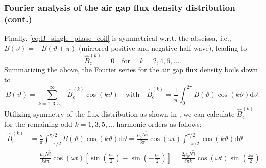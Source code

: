 \begin{frame}
	\frametitle{Fourier analysis of the air gap flux density distribution (cont.)}
        Finally, \eqref{eq:B_single_phase_coil} is symmetrical w.r.t. the abscissa, i.e., $B(\vartheta)=-B(\vartheta+\pi)$ (mirrored positive and negative half-wave), leading to
        $$\hat{B}_{\mathrm{c}}^{(k)} = 0 \quad \mbox{for } \quad k=2,4,6,\ldots .$$
        Summarizing the above, the Fourier series for the air gap flux density boils down to
        \begin{equation}
            B(\vartheta) = \sum_{k=1,3,5,\ldots}^{\infty} \hat{B}_{\mathrm{c}}^{(k)} \cos(k \vartheta) \quad \mbox{with} \quad \hat{B}_{\mathrm{c}}^{(k)} = \frac{1}{\pi} \int_{0}^{2 \pi} B(\vartheta) \cos(k \vartheta) \mathrm{d}\vartheta.
            \label{eq:fourier_series_B_single_phase_coil_reduced}
        \end{equation}
        Utilizing symmetry of the flux distribution as shown in , we can calculate $\hat{B}_{\mathrm{c}}^{(k)}$ for the remaining odd $k=1,3,5,\ldots$ harmonic orders as follows:
        \begin{equation}
            \begin{split}
                \hat{B}_{\mathrm{c}}^{(k)} &= \frac{2}{\pi} \int_{-\pi/2}^{\pi/2} B(\vartheta) \cos(k \vartheta) \mathrm{d}\vartheta = \frac{\mu_0 N \hat{i}}{\delta \pi } \cos(\omega t) \int_{-\pi/2}^{\pi/2} \cos(k \vartheta) \mathrm{d}\vartheta \\ &= \frac{\mu_0 N \hat{i}}{k \delta \pi } \cos(\omega t) \left[ \sin(\frac{k \pi}{2}) - \sin(-\frac{k \pi}{2}) \right] = \frac{2 \mu_0 N \hat{i}}{\delta \pi k} \cos(\omega t) \sin(\frac{k \pi}{2}).
            \end{split}
        \end{equation}
\end{frame}

